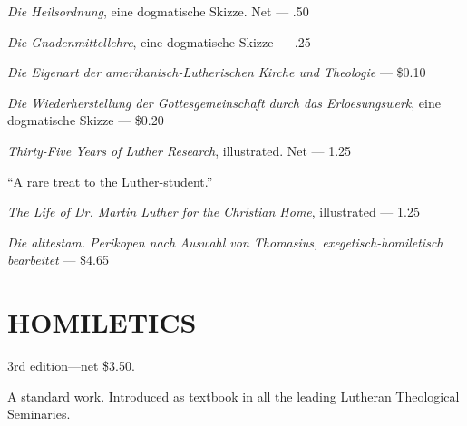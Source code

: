 \emph{Die Heilsordnung}, eine dogmatische Skizze. Net — .50

\emph{Die Gnadenmittellehre}, eine dogmatische Skizze — .25

\emph{Die Eigenart der amerikanisch-Lutherischen Kirche und Theologie} — \$0.10

\emph{Die Wiederherstellung der Gottesgemeinschaft durch das Erloesungswerk}, eine dogmatische Skizze — \$0.20

\emph{Thirty-Five Years of Luther Research}, illustrated. Net — 1.25

“A rare treat to the Luther-student.”

\emph{The Life of Dr. Martin Luther for the Christian Home}, illustrated — 1.25

\emph{Die alttestam. Perikopen nach Auswahl von Thomasius, exegetisch-homiletisch bearbeitet} — \$4.65

\section{HOMILETICS}

3rd edition—net \$3.50.

A standard work. Introduced as textbook in all the leading Lutheran Theological Seminaries.
